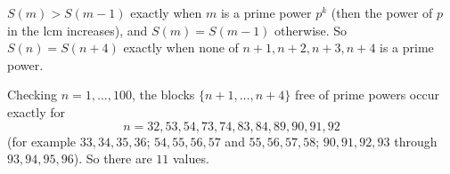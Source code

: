 $S(m)>S(m-1)$ exactly when $m$ is a prime power $p^k$ (then the power of $p$ in the lcm increases), and $S(m)=S(m-1)$ otherwise. So $S(n)=S(n+4)$ exactly when none of $n+1,n+2,n+3,n+4$ is a prime power.

Checking $n=1,\dots,100$, the blocks $\{n+1,\dots,n+4\}$ free of prime powers occur exactly for
\[n=32,53,54,73,74,83,84,89,90,91,92\]
(for example $33,34,35,36$; $54,55,56,57$ and $55,56,57,58$; $90,91,92,93$ through $93,94,95,96$). So there are $\boxed{11}$ values.
